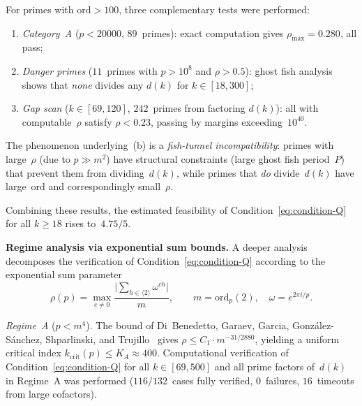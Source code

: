 \documentclass[12pt, a4paper]{amsart}
\theoremstyle{plain}
\theoremstyle{definition}
\theoremstyle{remark}
\newcommand{\ord}{\mathrm{ord}}
\begin{document}
For primes with $\ord > 100$, three complementary tests
were performed:
\begin{enumerate}[label=(\alph*)]
  \item \emph{Category~A} ($p < 20000$, $89$~primes):
    exact computation gives $\rho_{\max} = 0.280$,
    all pass;
  \item \emph{Danger primes} ($11$~primes with $p > 10^8$
    and $\rho > 0.5$): ghost fish analysis shows that
    \emph{none} divides any $d(k)$ for $k \in [18, 300]$;
  \item \emph{Gap scan} ($k \in [69, 120]$, $242$~primes
    from factoring $d(k)$): all with computable~$\rho$ satisfy
    $\rho < 0.23$, passing by margins exceeding~$10^{40}$.
\end{enumerate}
The phenomenon underlying~(b) is a \emph{fish-tunnel
incompatibility}: primes with large~$\rho$ (due to
$p \gg m^2$) have structural constraints (large ghost fish
period~$P$) that prevent them from dividing~$d(k)$, while
primes that \emph{do} divide~$d(k)$ have large~$\ord$
and correspondingly small~$\rho$.

Combining these results, the estimated feasibility of
Condition~\eqref{eq:condition-Q} for all $k \geq 18$
rises to~$4.75/5$.

\medskip\noindent
\textbf{Regime analysis via exponential sum bounds.}
A deeper analysis decomposes the verification of
Condition~\eqref{eq:condition-Q} according to the
exponential sum parameter
\[
  \rho(p) = \max_{c \neq 0}
    \frac{\bigl|\sum_{h \in \langle 2 \rangle} \omega^{ch}\bigr|}{m},
  \qquad m = \ord_p(2),\quad \omega = e^{2\pi i/p}.
\]

\emph{Regime~A} ($p < m^4$).
The bound of Di~Benedetto, Garaev, Garcia,
Gonz\'alez-S\'anchez, Shparlinski, and
Trujillo~\cite{DiBenedetto2020} gives
$\rho \leq C_1 \cdot m^{-31/2880}$, yielding a uniform
critical index $k_{\mathrm{crit}}(p) \leq K_A \approx 400$.
Computational verification of
Condition~\eqref{eq:condition-Q} for all
$k \in [69, 500]$ and all prime factors of~$d(k)$ in
Regime~A was performed ($116/132$~cases fully verified,
$0$~failures, $16$~timeouts from large cofactors).
\end{document}
